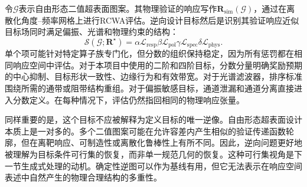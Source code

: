 令$\mathcal{G}$表示自由形态二值超表面图案。其物理验证的响应写作$\mathbf{R}_{\mathrm{sim}}(\mathcal{G})$，通过在离散化角度--频率网格上进行RCWA评估。逆向设计目标然后是识别其验证响应近似目标场同时满足偏振、光谱和物理约束的结构：
\[
\mathcal{S}(\mathcal{G};\mathbf{R}^{\star})=
\alpha \mathcal{L}_{\mathrm{resp}}
\beta \mathcal{L}_{\mathrm{pol}}
\gamma \mathcal{L}_{\mathrm{spec}}
\delta \mathcal{L}_{\mathrm{phys}}.
\]
单个项可能针对特定算子族专门化，但分数的组织保持稳定，因为所有惩罚都在相同响应空间中评估。对于本项目中使用的二阶和四阶目标，分数分量明确奖励预期的中心抑制、目标形状一致性、边缘行为和有效带宽。对于光谱滤波器，排序标准围绕所需的通带或阻带结构重组。对于偏振敏感目标，通道泄漏和通道分离直接进入分数定义。在每种情况下，评估仍然指回相同的物理响应张量。

同样重要的是，这个目标不应被解释为定义目标的唯一逆像。自由形态超表面设计本质上是一对多的。多个二值图案可能在允许容差内产生相似的验证传递函数轮廓，但在离靶响应、可制造性或离散化鲁棒性上有所不同。因此，逆向问题更好地被理解为目标条件可行集的恢复，而非单一规范几何的恢复。这种可行集视角是下一节生成式处理的动机。确定性逆图可以作为基线有用，但它无法表示在响应空间表述中自然产生的物理合理结构的多重性。
